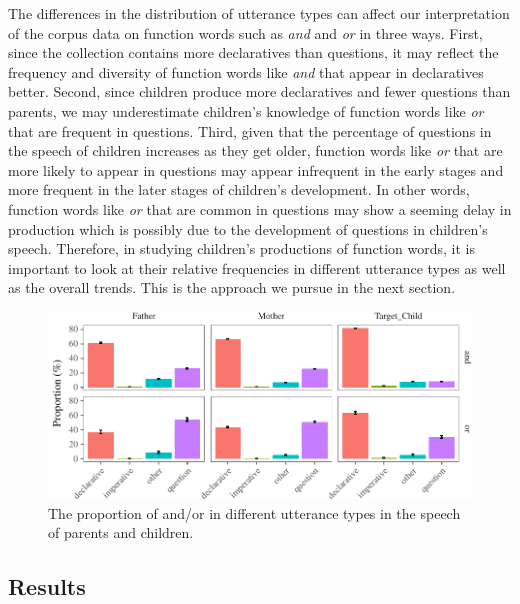 \documentclass[oneside]{report}
\theoremstyle{definition}
\theoremstyle{definition}
\theoremstyle{definition}
\theoremstyle{remark}
\begin{document}
The differences in the distribution of utterance types can affect our
interpretation of the corpus data on function words such as \emph{and}
and \emph{or} in three ways. First, since the collection contains more
declaratives than questions, it may reflect the frequency and diversity
of function words like \emph{and} that appear in declaratives better.
Second, since children produce more declaratives and fewer questions
than parents, we may underestimate children's knowledge of function
words like \emph{or} that are frequent in questions. Third, given that
the percentage of questions in the speech of children increases as they
get older, function words like \emph{or} that are more likely to appear
in questions may appear infrequent in the early stages and more frequent
in the later stages of children's development. In other words, function
words like \emph{or} that are common in questions may show a seeming
delay in production which is possibly due to the development of
questions in children's speech. Therefore, in studying children's
productions of function words, it is important to look at their relative
frequencies in different utterance types as well as the overall trends.
This is the approach we pursue in the next section.
\begin{figure}[tb]

{\centering \includegraphics{figs/CnctPropbySpeechAct-1} 

}

\caption{The proportion of and/or in different utterance types in the speech of parents and children.}\label{fig:CnctPropbySpeechAct}
\end{figure}
\subsection{Results}\label{study1results}
\end{document}
